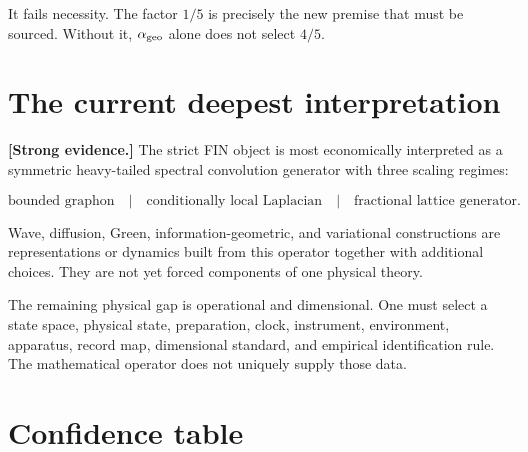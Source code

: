 \documentclass[11pt,a4paper,openany]{report}
\begin{document}
It fails necessity. The factor \(1/5\) is precisely the new premise that must be sourced. Without it, \(\alpha_{\rm geo}\) alone does not select \(4/5\).

\section{The current deepest interpretation}

\textbf{[Strong evidence.]} The strict FIN object is most economically interpreted as a symmetric heavy-tailed spectral convolution generator with three scaling regimes:

\[
\text{bounded graphon}
\quad\big|\quad
\text{conditionally local Laplacian}
\quad\big|\quad
\text{fractional lattice generator}.
\]

Wave, diffusion, Green, information-geometric, and variational constructions are representations or dynamics built from this operator together with additional choices. They are not yet forced components of one physical theory.

The remaining physical gap is operational and dimensional. One must select a state space, physical state, preparation, clock, instrument, environment, apparatus, record map, dimensional standard, and empirical identification rule. The mathematical operator does not uniquely supply those data.

\section{Confidence table}
\end{document}
